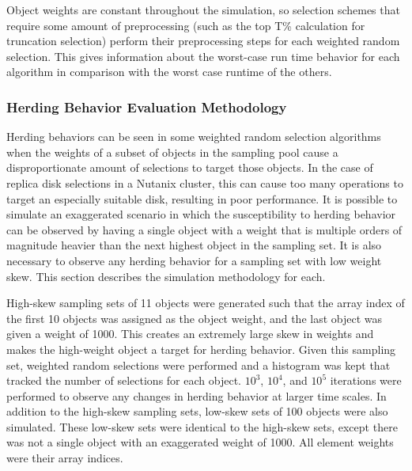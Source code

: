 \documentclass[12pt]{article}
\begin{document}
    Object weights are constant throughout the simulation, so selection schemes
    that require some amount of preprocessing (such as the top T\% calculation
    for truncation selection) perform their preprocessing steps for each
    weighted random selection. This gives information about the worst-case
    run time behavior for each algorithm in comparison with the worst case
    runtime of the others.

    \subsubsection{Herding Behavior Evaluation Methodology}
    Herding behaviors can be seen in some weighted random selection
    algorithms when the weights of a subset of objects in the sampling pool
    cause a disproportionate amount of selections to target those objects. In
    the case of replica disk selections in a Nutanix cluster, this can cause
    too many operations to target an especially suitable disk, resulting in
    poor performance. It is possible to simulate an exaggerated scenario in
    which the susceptibility to herding behavior can be observed by having a
    single object with a weight that is multiple orders of magnitude heavier
    than the next highest object in the sampling set. It is also necessary to
    observe any herding behavior for a sampling set with low weight skew. This
    section describes the simulation methodology for each.

    High-skew sampling sets of 11 objects were generated such that the array
    index of the first 10 objects was assigned as the object weight, and the
    last object was given a weight of 1000. This creates an extremely large
    skew in weights and makes the high-weight object a target for herding
    behavior. Given this sampling set, weighted random selections were
    performed and a histogram was kept that tracked the number of selections
    for each object. $10^3$, $10^4$, and $10^5$ iterations were performed to
    observe any changes in herding behavior at larger time scales. In addition
    to the high-skew sampling sets, low-skew sets of 100 objects were also
    simulated.  These low-skew sets were identical to the high-skew sets,
    except there was not a single object with an exaggerated weight of 1000.
    All element weights were their array indices.
\end{document}
